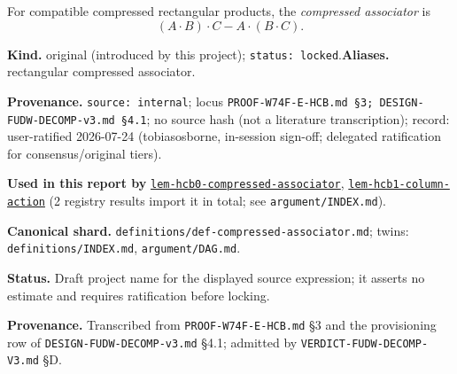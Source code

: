 \hypertarget{def:compressed-associator}{}%
\begin{definition}\label{def:compressed-associator}
For compatible compressed rectangular products, the
\emph{compressed associator} is
\[
(A\mathbin{\cdot}B)\mathbin{\cdot}C
-A\mathbin{\cdot}(B\mathbin{\cdot}C).
\]
\end{definition}
\begin{defnote}
\textbf{Kind.} original (introduced by this project); \texttt{status: locked}.\quad\textbf{Aliases.} rectangular compressed associator.
\par
\textbf{Provenance.} \texttt{source: internal}; locus \texttt{PROOF-\allowbreak{}W74F-\allowbreak{}E-\allowbreak{}HCB.\allowbreak{}md \S{}3;\allowbreak{} DESIGN-\allowbreak{}FUDW-\allowbreak{}DECOMP-\allowbreak{}v3.\allowbreak{}md \S{}4.\allowbreak{}1}; no source hash (not a literature transcription); record: user-\allowbreak{}ratified 2026-\allowbreak{}07-\allowbreak{}24 (tobiasosborne,\allowbreak{} in-\allowbreak{}session sign-\allowbreak{}off;\allowbreak{} delegated ratification for consensus/\allowbreak{}original tiers).
\par
\textbf{Used in this report by} \hyperref[lem:hcb0-compressed-associator]{\texttt{lem-\allowbreak{}hcb0-\allowbreak{}compressed-\allowbreak{}associator}}, \hyperref[lem:hcb1-column-action]{\texttt{lem-\allowbreak{}hcb1-\allowbreak{}column-\allowbreak{}action}} (2 registry results import it in total; see \texttt{argument/INDEX.md}).
\par
\textbf{Canonical shard.} \texttt{definitions/\allowbreak{}def-\allowbreak{}compressed-\allowbreak{}associator.\allowbreak{}md}; twins: \texttt{definitions/INDEX.md}, \texttt{argument/DAG.md}.
\par
\textbf{Status.} Draft project name for the displayed source expression; it
asserts no estimate and requires ratification before locking.

\textbf{Provenance.} Transcribed from \texttt{PROOF-\allowbreak{}W74F-\allowbreak{}E-\allowbreak{}HCB.\allowbreak{}md} \S{}3 and the provisioning
row of \texttt{DESIGN-\allowbreak{}FUDW-\allowbreak{}DECOMP-\allowbreak{}v3.\allowbreak{}md} \S{}4.1; admitted by
\texttt{VERDICT-\allowbreak{}FUDW-\allowbreak{}DECOMP-\allowbreak{}V3.\allowbreak{}md} \S{}D.
\end{defnote}

